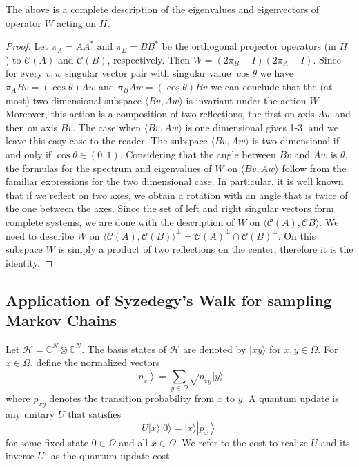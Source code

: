 The above is a complete description of the eigenvalues and eigenvectors of operator $W$ acting on $H$.

\begin{proof} Let $\pi_A=A A^*$ and $\pi_B=B B^*$ be the orthogonal projector operators (in $H$ ) to $\mathcal{C}(A)$ and $\mathcal{C}(B)$, respectively. Then $W=\left(2 \pi_B-I\right)\left(2 \pi_A-I\right)$. Since for every $v, w$ singular vector pair with singular value $\cos \theta$ we have $\pi_A B v=(\cos \theta) A w$ and $\pi_B A w=(\cos \theta) B v$ we can conclude that the (at most) two-dimensional subspace $\langle B v, A w\rangle$ is invariant under the action $W$. Moreover, this action is a composition of two reflections, the first on axis $A w$ and then on axis $B v$. The case when $\langle B v, A w\rangle$ is one dimensional gives 1-3, and we leave this easy case to the reader. The subspace $\langle B v, A w\rangle$ is two-dimensional if and only if $\cos \theta \in(0,1)$. Considering that the angle between $B v$ and $A w$ is $\theta$, the formulas for the spectrum and eigenvalues of $W$ on $\langle B v, A w\rangle$ follow from the familiar expressions for the two dimensional case. In particular, it is well known that if we reflect on two axes, we obtain a rotation with an angle that is twice of the one between the axes. Since the set of left and right singular vectors form complete systems, we are done with the description of $W$ on $\langle\mathcal{C}(A), \mathcal{C} B\rangle$. We need to describe $W$ on $\langle\mathcal{C}(A), \mathcal{C}(B)\rangle^{\perp}=\mathcal{C}(A)^{\perp} \cap \mathcal{C}(B)^{\perp}$. On this subspace $W$ is simply a product of two reflections on the center, therefore it is the identity.

\end{proof}
\subsection{Application of Syzedegy's Walk for sampling Markov Chains}
 Let $\mathcal{H}=\mathbb{C}^N \otimes \mathbb{C}^N$. The basis states of $\mathcal{H}$ are denoted by $|x y\rangle$ for $x, y \in \Omega$. For $x \in \Omega$, define the normalized vectors
$$
\left|p_x\right\rangle=\sum_{y \in \Omega} \sqrt{p_{x y}}|y\rangle
$$
where $p_{x y}$ denotes the transition probability from $x$ to $y$. A quantum update is any unitary $U$ that satisfies
$$
U|x\rangle|0\rangle=|x\rangle\left|p_x\right\rangle
$$
for some fixed state $0 \in \Omega$ and all $x \in \Omega$. We refer to the cost to realize $U$ and its inverse $U^{\dagger}$ as the quantum update cost.

